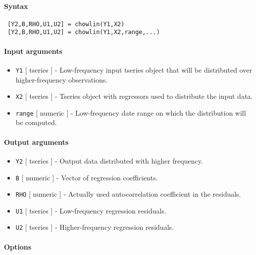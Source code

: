 


	\paragraph{Syntax}
 
 \begin{verbatim}
 [Y2,B,RHO,U1,U2] = chowlin(Y1,X2)
 [Y2,B,RHO,U1,U2] = chowlin(Y1,X2,range,...)
 \end{verbatim}
 
 \paragraph{Input arguments}
 
 \begin{itemize}
 \item
   \texttt{Y1} {[} tseries {]} - Low-frequency input tseries object that
   will be distributed over higher-frequency observations.
 \item
   \texttt{X2} {[} tseries {]} - Tseries object with regressors used to
   distribute the input data.
 \item
   \texttt{range} {[} numeric {]} - Low-frequency date range on which the
   distribution will be computed.
 \end{itemize}
 
 \paragraph{Output arguments}
 
 \begin{itemize}
 \item
   \texttt{Y2} {[} tseries {]} - Output data distributed with higher
   frequency.
 \item
   \texttt{B} {[} numeric {]} - Vector of regression coefficients.
 \item
   \texttt{RHO} {[} numeric {]} - Actually used autocorrelation
   coefficient in the residuals.
 \item
   \texttt{U1} {[} tseries {]} - Low-frequency regression residuals.
 \item
   \texttt{U2} {[} tseries {]} - Higher-frequency regression residuals.
 \end{itemize}
 
 \paragraph{Options}
 
